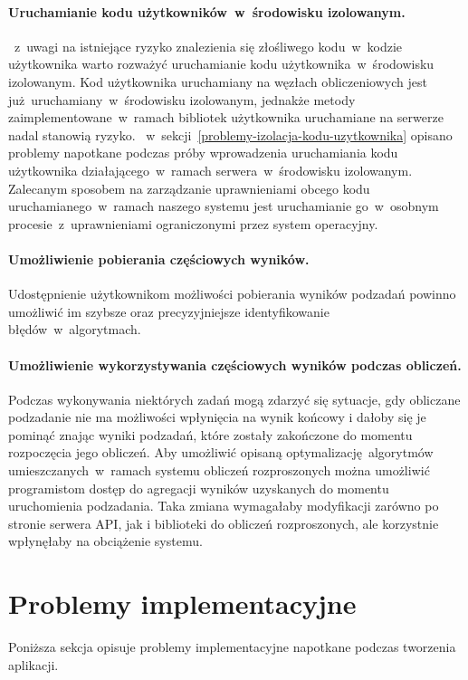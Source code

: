 \documentclass[a4paper,11pt,twoside]{report}
\theoremstyle{definition}
\begin{document}
        \paragraph{Uruchamianie kodu użytkowników~w~środowisku izolowanym.}
        \label{uruchamianie-w-srodowisku-izolowanym}
       ~z~uwagi na istniejące ryzyko znalezienia się złośliwego kodu~w~kodzie użytkownika warto rozważyć uruchamianie kodu użytkownika~w~środowisku izolowanym. Kod użytkownika uruchamiany na węzłach obliczeniowych jest już uruchamiany~w~środowisku izolowanym, jednakże metody zaimplementowane~w~ramach bibliotek użytkownika uruchamiane na serwerze nadal stanowią ryzyko.
       ~w~sekcji~\ref{problemy-izolacja-kodu-uzytkownika}
        opisano problemy napotkane podczas próby wprowadzenia uruchamiania kodu użytkownika działającego~w~ramach serwera~w~środowisku izolowanym. 
        Zalecanym sposobem na zarządzanie uprawnieniami obcego kodu uruchamianego~w~ramach naszego systemu jest uruchamianie go~w~osobnym procesie~z~uprawnieniami ograniczonymi przez system operacyjny.
        
        \paragraph{Umożliwienie pobierania częściowych wyników.}
        Udostępnienie użytkownikom możliwości pobierania wyników podzadań powinno umożliwić im szybsze oraz precyzyjniejsze identyfikowanie błędów~w~algorytmach.

        \paragraph{Umożliwienie wykorzystywania częściowych wyników podczas obliczeń.}
        Podczas wykonywania niektórych zadań mogą zdarzyć się sytuacje, gdy obliczane podzadanie nie ma możliwości wpłynięcia na wynik końcowy i dałoby się je pominąć znając wyniki podzadań, które zostały zakończone do momentu rozpoczęcia jego obliczeń.
        Aby umożliwić opisaną optymalizację algorytmów umieszczanych~w~ramach systemu obliczeń rozproszonych można umożliwić programistom dostęp do agregacji wyników uzyskanych do momentu uruchomienia podzadania.
        Taka zmiana wymagałaby modyfikacji zarówno po stronie serwera API, jak i biblioteki do obliczeń rozproszonych, ale korzystnie wpłynęłaby na obciążenie systemu.
        
    \section{Problemy implementacyjne}
        \label{problemy-implementacyjne}
        Poniższa sekcja opisuje problemy implementacyjne napotkane podczas tworzenia aplikacji.
        
\end{document}
